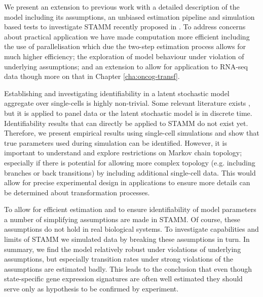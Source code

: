 We present an extension to previous work with a detailed description of the model including its assumptions, an unbiased estimation pipeline and simulation based tests to investigate STAMM recently proposed in \cite{Armond:2013}. To address concerns about practical application we have made computation more efficient including the use of parallelisation which due the two-step estimation process allows for much higher efficiency; the exploration of model behaviour under violation of underlying assumptions; and an extension to allow for application to RNA-seq data though more on that in Chapter \ref{cha:oncog-transf}.



Establishing and investigating identifiability in a latent stochastic model aggregate over single-cells is highly non-trivial. Some relevant literature exists \citep{Kalbfleisch:1983vd, Kalbfleisch:1984wz, Kalbfleisch:1985tw}, but it is applied to panel data or the latent stochastic model is in discrete time. Identifiability results that can directly be applied to STAMM do not exist yet.  Therefore, we present empirical results using single-cell simulations and show that true parameters used during simulation can be identified. However, it is important to understand and explore restrictions on Markov chain topology; especially if there is potential for allowing more complex topology (e.g. including branches or back transitions) by including additional single-cell data. This would allow for precise experimental design in applications to ensure more details can be determined about transformation processes.

To allow for efficient estimation and to ensure identifiability of model parameters a number of simplifying assumptions are made in STAMM. Of course, these assumptions do not hold in real biological systems. To investigate capabilities and limits of STAMM we simulated data by breaking these assumptions in turn. In summary, we find the model relatively robust under violations of underlying assumptions, but especially transition rates under strong violations of the assumptions are estimated badly. This leads to the conclusion that even though state-specific gene expression signatures are often well estimated they should serve only as hypothesis to be confirmed by experiment.


